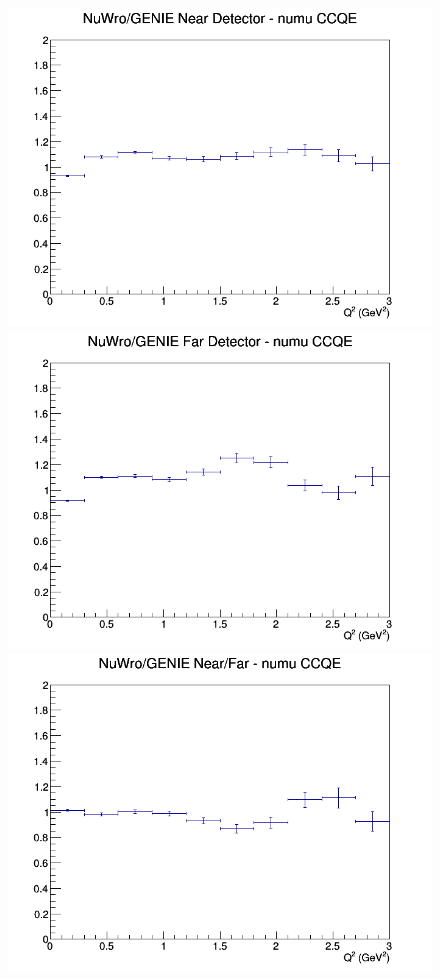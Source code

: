 \documentclass[12pt]{article}
\begin{document}
\begin{figure}[h]
\endminipage
\newline
{}
\includegraphics[width=\linewidth]{eff_Q2/GAr/ratios/CCQE_NuWro_GENIE_numu_near_Q2.png}
\endminipage
{}
\includegraphics[width=\linewidth]{eff_Q2/GAr/ratios/CCQE_NuWro_GENIE_numu_far_Q2.png}
\endminipage
{}
\includegraphics[width=\linewidth]{eff_Q2/GAr/ratios/CCQE_NuWro_GENIE_numu_NF_Q2.png}
\endminipage
\newline
\end{figure}
\clearpage
\end{document}
